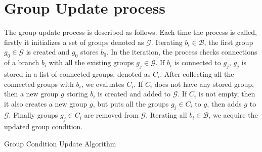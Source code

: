 \documentclass[review]{acmsiggraph}
\begin{document}
 \section{Group Update process}
 The group update process is described as follows.
 Each time the process is called, firstly it initializes a set of groups denoted as $\mathcal{G}$.
 Iterating $b_i \in \mathcal{B}$, the first group $g_0 \in \mathcal{G}$ is created and $g_0$ stores $b_0$.
 In the iteration, the process checks connections of a branch $b_i$ with all the existing groups $ g_j \in \mathcal{G}$.
 If $b_i$ is connected to $g_j$, $g_j$ is stored in a list of connected groups, denoted as $C_i$.
 After collecting all the connected groups with $b_i$, we evaluates $C_i$.
 If $C_i$ does not have any stored group, then a new group $g$ storing $b_i$ is created and added to $\mathcal{G}$.
 If $C_i$ is not empty, then it also creates a new group $g$, but puts all the groups $g_j \in C_i$ to $g$, then adds $g$ to $\mathcal{G}$.
 Finally groups $g_j \in C_i$ are removed from $\mathcal{G}$.
 Iterating all $b_i \in \mathcal{B}$, we acquire the updated group condition.

 \begin{algorithm}
   \caption{Group Condition Update Algorithm}
   \begin{algorithmic}[1]

           \EndIf
       \EndFor

 			\EndFor
 		\EndFor
 		\EndFor
 	\EndFor
   \EndFunction
   \end{algorithmic}
   \label{al:connection}
 \end{algorithm}
\end{document}
